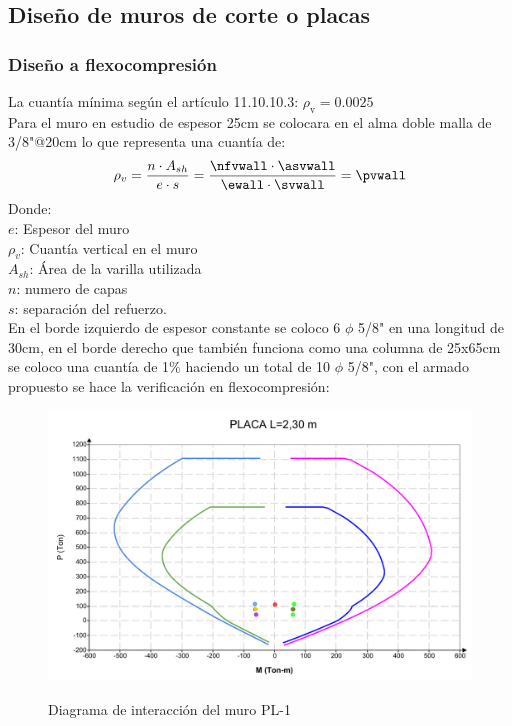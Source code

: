 \subsection{Diseño de muros de corte o placas}
\subsubsection{Diseño a flexocompresión}
La cuantía mínima según el artículo 11.10.10.3: $\rho_{\mathrm{v}}=0.0025$\\
Para el muro en estudio de espesor 25cm se colocara en el alma doble malla de 3/8"@20cm lo que representa una cuantía de:
\FPset{}
\FPset{}
\FPset{}
\FPset{}
\FPeval{}
\begin{align*}
\rho_{v} =\frac{n\cdot A_{sh}}{e\cdot s}=\frac{\nfvwall\cdot \asvwall}{\ewall\cdot \svwall}=\pvwall
\end{align*}
\noindent
Donde:\\
$e$: Espesor del muro\\
$\rho_{v}$: Cuantía vertical en el muro\\
$A_{sh}$: Área de la varilla utilizada\\
$n$: numero de capas\\
$s$: separación del refuerzo.\\
En el borde izquierdo de espesor constante se coloco 6 $\phi$ 5/8" en una longitud de 30cm, en el borde derecho que también funciona como una columna de 25x65cm se coloco una cuantía de 1\% haciendo un total de 10 $\phi$ 5/8", con el armado propuesto se hace la verificación en flexocompresión: 
\begin{figure}[h!]
    \centering
    \caption{Diagrama de interacción del muro PL-1}
    \includegraphics[scale=0.67]{IMAGENES/pl2.pdf}
    \label{atrans}
\end{figure}

